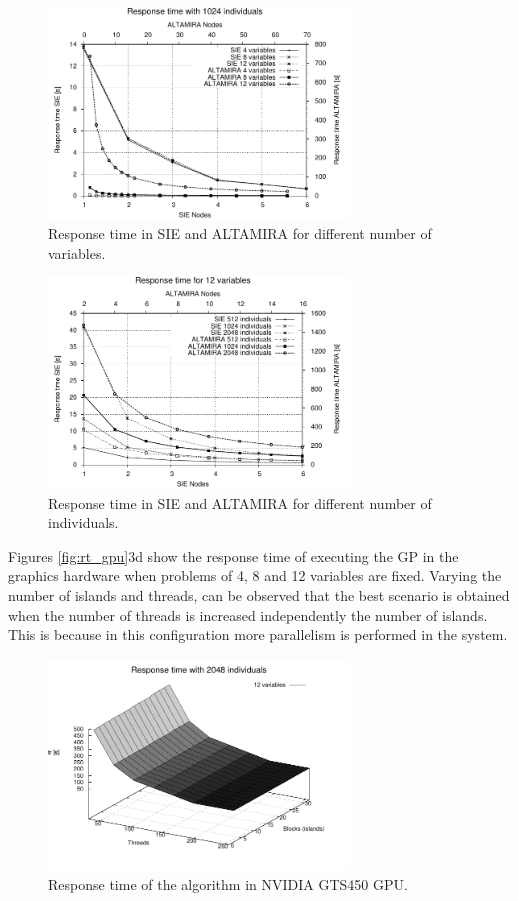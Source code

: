 \documentclass[runningheads,a4paper]{llncs}
\begin{document}
\begin{figure}[h!]
\begin{center}
\includegraphics[width=8cm]{./images/response_time_1024indiv} 
\end{center}
\caption{Response time in SIE and ALTAMIRA for different number of variables.}
\label{fig:rt_vars}
\end{figure}

\begin{figure}[h!]
\begin{center} 
\includegraphics[width=8cm]{./images/response_time_12var} 
\end{center}
\caption{Response time in SIE and ALTAMIRA for different number of individuals.}
\label{fig:rt_indv}
\end{figure}

Figures \ref{fig:rt_gpu}3d show the response time of executing the GP in the graphics hardware when problems of 4, 8 and 12 variables are fixed. Varying the number of islands and threads, can be observed that the best scenario is obtained when the number of threads is increased independently the number of islands. This is because in this configuration more parallelism is performed in the system.


\begin{figure}[h]
\begin{center} 
\includegraphics[width=8cm]{./images/response_time_threads_cuda_12var}
\end{center}
\caption{Response time of the algorithm in NVIDIA GTS450 GPU.}
\label{fig:rt_gpu3d}
\end{figure}
\end{document}
